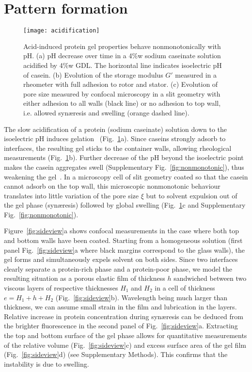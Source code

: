 \documentclass[twocolumn,superscriptaddress,showpacs,preprintnumbers,
amsmath,amssymb,prl]{revtex4-1}
\begin{document}
\section*{Pattern formation}

\begin{figure}
	\texttt{[image: acidification]}%
	\caption{Acid-induced protein gel properties behave nonmonotonically with pH. (a) pH decrease over time in a 4\%w sodium caseinate solution acidified by 4\%w GDL. The horizontal line indicates isoelectric pH of casein. (b) Evolution of the storage modulus $G'$ measured in a rheometer with full adhesion to rotor and stator. (c) Evolution of pore size measured by confocal microscopy in a slit geometry with either adhesion to all walls (black line) or no adhesion to top wall, i.e. allowed syn\ae{}resis and swelling (orange dashed line).}%
	\label{fig:acidification}%
\end{figure}


The slow acidification of a protein (sodium caseinate) solution down to the isoelectric pH induces gelation~\cite{Bremer1989} (Fig.~\ref{fig:acidification}a). Since caseins strongly adsorb to interfaces, the resulting gel sticks to the container walls, allowing rheological measurements (Fig.~\ref{fig:acidification}b). Further decrease of the pH beyond the isoelectric point makes the casein aggregates swell (Supplementary Fig.~\ref{fig:nonmonotonic}), thus weakening the gel~\cite{Braga2006}. In a microscopy cell of slit geometry coated so that the casein cannot adsorb on the top wall, this microscopic nonmonotonic behaviour translates into little variation of the pore size $\xi$ but to solvent expulsion out of the gel phase (syn\ae{}resis) followed by global swelling (Fig.~\ref{fig:acidification}c and Supplementary Fig.~\ref{fig:nonmonotonic}).



Figure~\ref{fig:sideview}a shows confocal measurements in the case where both top and bottom walls have been coated. Starting from a homogeneous solution (first panel Fig.~\ref{fig:sideview}a where black margins correspond to the glass walls), the gel forms and simultaneously expels solvent on both sides. Since two interfaces clearly separate a protein-rich phase and a protein-poor phase, we model the resulting situation as a porous elastic film of thickness $h$ sandwiched between two viscous layers of respective thicknesses $H_1$ and $H_2$ in a cell of thickness $e=H_1+h+H_2$ (Fig.~\ref{fig:sideview}b). Wavelength being much larger than thickness, we can assume small strain in the film and lubrication in the layers. Relative increase in protein concentration during syn\ae{}resis can be deduced from the brighter fluorescence in the second panel of Fig.~\ref{fig:sideview}a. Extracting the top and bottom surface of the gel phase allows for quantitative measurements of the relative volume (Fig.~\ref{fig:sideview}c) and excess surface area of the gel film (Fig.~\ref{fig:sideview}d) (see Supplementary Methods). This confirms that the instability is due to swelling.
\end{document}
